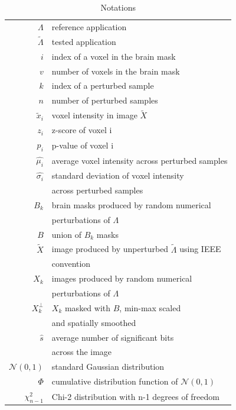 \documentclass[lettersize,journal]{IEEEtran}
\begin{document}
\begin{table}
    \centering
    \begin{tabular}{r|l}
        $\Lambda$          & reference application                                     \\
        $\tilde \Lambda$   & tested application                                        \\
        $i$                & index of a voxel in the brain mask                        \\
        $v$                & number of voxels in the brain mask                        \\
        $k$                & index of a perturbed sample                               \\
        $n$                & number of perturbed samples                               \\
        $\tilde x_i$       & voxel intensity in image $\tilde X$                       \\
        $z_i$              & z-score of voxel i                                        \\
        $p_i$              & p-value of voxel i                                        \\
        $\hat{\mu_i}$      & average voxel intensity across perturbed samples          \\
        $\hat{\sigma_i}$   & standard deviation of voxel intensity                     \\ & across perturbed samples       \\
        $B_k$              & brain masks produced by random numerical                  \\ & perturbations of $\Lambda$  \\
        $B$                & union of $B_k$ masks                                      \\
        $\tilde X$         & image produced by unperturbed $\tilde \Lambda$ using IEEE \\ & convention \\
        $X_k$              & images produced by random numerical                       \\ &  perturbations of $\Lambda$       \\
        $X_k^{\perp}$      & $X_k$ masked with $B$, min-max scaled                     \\ &  and spatially smoothed         \\
        $\hat{s}$          & average number of significant bits                        \\ & across the image \\
        $\mathcal{N}(0,1)$ & standard Gaussian distribution                            \\
        $\Phi$             & cumulative distribution function of $\mathcal{N}(0,1)$    \\
        $\chi^2_{n-1}$     & Chi-2 distribution with n-1 degrees of freedom            \\
    \end{tabular}
    \caption{Notations}
    \label{tab:notations}
\end{table}
\end{document}
